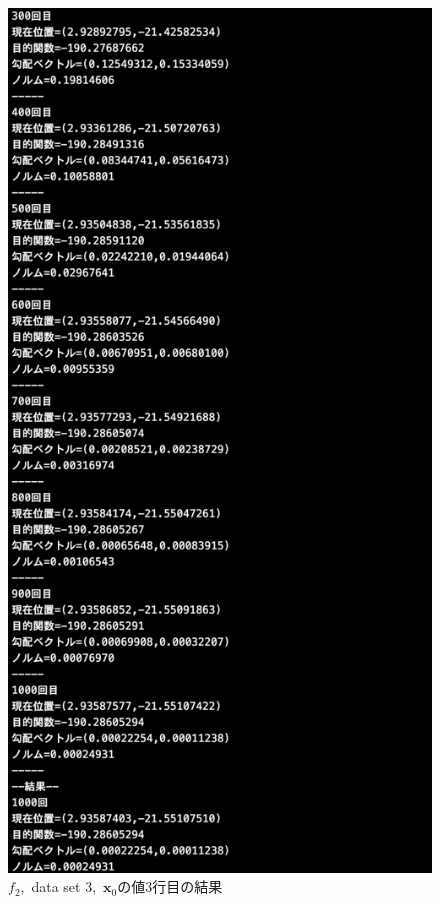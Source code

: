 \documentclass[12pt]{jarticle}
\begin{document}
\begin{figure}[h]
\begin{minipage}{0.5\hsize}
    \end{minipage}
    \begin{minipage}{0.5\hsize}
        \begin{center}
            \includegraphics[scale=0.2]{kadai1_2s_out3_3_3.png}
        \end{center}
    \end{minipage}
    \caption{$f_2$,\ data set 3,\ $\boldsymbol{x}_0$の値3行目の結果}
\end{figure}
\end{document}
